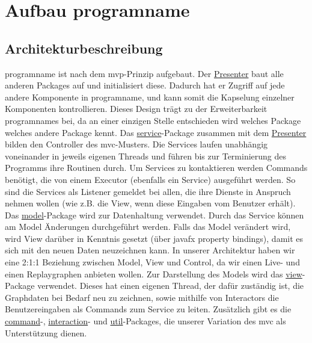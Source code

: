 \chapter{Aufbau \gls{programname}}
\label{ch:aufbau_programname}

\section{Architekturbeschreibung}

\gls{programname} ist nach dem \gls{mvp}-Prinzip aufgebaut. Der
\hyperref[subsec:presenter]{Presenter} baut alle anderen Packages auf und
initialisiert diese. Dadurch hat er Zugriff auf jede andere Komponente in \gls{programname},
und kann somit die Kapselung einzelner Komponenten kontrollieren. Dieses Design
trägt zu der Erweiterbarkeit \gls{programname}s bei, da an einer einzigen
Stelle entschieden wird welches Package welches andere Package kennt.
\newline
\newline
Das \hyperref[subsec:service]{service}-Package zusammen mit dem \hyperref[subsec:presenter]{Presenter}
bilden den Controller des \gls{mvc}-Musters. Die Services laufen unabhängig voneinander in 
jeweils eigenen Threads und führen bis zur Terminierung des Programms ihre Routinen durch. 
Um Services zu kontaktieren werden Commands benötigt, die von einem Executor (ebenfalls ein 
Service) ausgeführt werden. So sind die Services als Listener gemeldet bei allen, die ihre 
Dienste in Anspruch nehmen wollen (wie z.B. die View, wenn diese Eingaben vom Benutzer erhält).
\newline
\newline
Das \hyperref[subsec:model]{model}-Package wird zur Datenhaltung verwendet. Durch das Service 
können am Model Änderungen durchgeführt werden. Falls das Model verändert wird, wird View 
darüber in Kenntnis gesetzt (über javafx property bindings), damit es sich mit den neuen Daten
neuzeichnen kann. In unserer Architektur haben wir eine 2:1:1 Beziehung zwischen Model, 
View und Control, da wir einen Live- und einen Replaygraphen anbieten wollen.
\newline
\newline
Zur Darstellung des Models wird das \hyperref[subsec:view]{view}-Package verwendet. Dieses 
hat einen eigenen Thread, der dafür zuständig ist, die Graphdaten bei Bedarf neu zu zeichnen, 
sowie mithilfe von Interactors die Benutzereingaben als Commands zum Service zu leiten.
\newline
\newline
Zusätzlich gibt es die \hyperref[subsec:command]{command}-, \hyperref[subsec:interaction]{interaction}- 
und \hyperref[subsec:util]{util}-Packages, die unserer Variation des \gls{mvc} als Unterstützung dienen.


